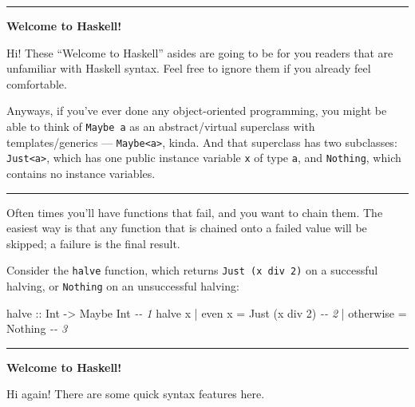 \documentclass[]{article}
\newenvironment{Shaded}{}{}
\newcommand{\CommentTok}[1]{\textcolor[rgb]{0.38,0.63,0.69}{\textit{#1}}}
\newcommand{\DataTypeTok}[1]{\textcolor[rgb]{0.56,0.13,0.00}{#1}}
\newcommand{\DecValTok}[1]{\textcolor[rgb]{0.25,0.63,0.44}{#1}}
\newcommand{\FunctionTok}[1]{\textcolor[rgb]{0.02,0.16,0.49}{#1}}
\newcommand{\NormalTok}[1]{#1}
\newcommand{\OperatorTok}[1]{\textcolor[rgb]{0.40,0.40,0.40}{#1}}
\newcommand{\OtherTok}[1]{\textcolor[rgb]{0.00,0.44,0.13}{#1}}
\begin{document}
\begin{center}\rule{0.5\linewidth}{\linethickness}\end{center}

\textbf{Welcome to Haskell!}

Hi! These ``Welcome to Haskell'' asides are going to be for you readers that are
unfamiliar with Haskell syntax. Feel free to ignore them if you already feel
comfortable.

Anyways, if you've ever done any object-oriented programming, you might be able
to think of \texttt{Maybe\ a} as an abstract/virtual superclass with
templates/generics --- \texttt{Maybe\textless{}a\textgreater{}}, kinda. And that
superclass has two subclasses: \texttt{Just\textless{}a\textgreater{}}, which
has one public instance variable \texttt{x} of type \texttt{a}, and
\texttt{Nothing}, which contains no instance variables.

\begin{center}\rule{0.5\linewidth}{\linethickness}\end{center}

Often times you'll have functions that fail, and you want to chain them. The
easiest way is that any function that is chained onto a failed value will be
skipped; a failure is the final result.

Consider the \texttt{halve} function, which returns
\texttt{Just\ (x\ \textasciigrave{}div\textasciigrave{}\ 2)} on a successful
halving, or \texttt{Nothing} on an unsuccessful halving:

\begin{Shaded}
\begin{Highlighting}[]
\OtherTok{halve ::} \DataTypeTok{Int} \OtherTok{{-}>} \DataTypeTok{Maybe} \DataTypeTok{Int}                       \CommentTok{{-}{-} 1}
\NormalTok{halve x }\OperatorTok{|} \FunctionTok{even}\NormalTok{ x    }\OtherTok{=} \DataTypeTok{Just}\NormalTok{ (x }\OtherTok{\textasciigrave{}div\textasciigrave{}} \DecValTok{2}\NormalTok{)          }\CommentTok{{-}{-} 2}
        \OperatorTok{|} \FunctionTok{otherwise} \OtherTok{=} \DataTypeTok{Nothing}                   \CommentTok{{-}{-} 3}
\end{Highlighting}
\end{Shaded}

\begin{center}\rule{0.5\linewidth}{\linethickness}\end{center}

\textbf{Welcome to Haskell!}

Hi again! There are some quick syntax features here.
\end{document}
